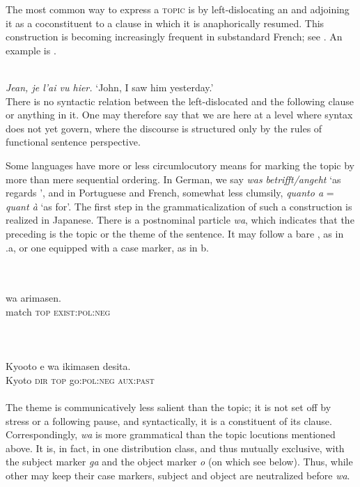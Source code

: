 The most common way to express a \textsc{topic} is by left-dislocating an \np and adjoining it as a coconstituent to a clause in which it is anaphorically resumed. This construction is becoming increasingly frequent in substandard French; see \citet{Ashby1981}. An example is .

\ea\label{ex:E92}
\langinfo{\LangFren}{}{}\\
 {\itshape Jean, je l'ai vu hier.}
\glt ‘John, I saw him yesterday.’\\
\z
\noindent There is no syntactic relation between the left-dislocated \np and the following clause or anything in it. One may therefore say that we are here at a level where syntax does not yet govern, where the discourse is structured only by the rules of functional sentence perspective.

Some languages have more or less circumlocutory means for marking the topic by more than mere sequential ordering. In German, we say \textit{was} \np \textit{betrifft/angeht} ‘as regards \np’, and in Portuguese and French, somewhat less clumsily, \textit{quanto a} = \textit{quant à} ‘as for’. The first step in the grammaticalization of such a construction is realized in Japanese. There is a postnominal particle \textit{wa}, which indicates that the preceding \np is the topic or the theme of the sentence. It may follow a bare \np, as in .a, or one equipped with a case marker, as in b.
 
\ea\label{ex:E93}
\langinfo{\LangJap}{}{} \\
 \ea {}\\
   {wa}  arimasen.\\
  {match}  {\textsc{top}}  \textsc{exist}:\textsc{pol}:\textsc{neg}\\
\\
\\
\ex {}\\
\gll  Kyooto  e  wa  ikimasen  desita.\\
  Kyoto   \textsc{dir}   \textsc{top}   go:\textsc{pol}:\textsc{neg}   \textsc{aux}:\textsc{past}\\
\\
\z
\z
\noindent The theme is communicatively less salient than the topic; it is not set off by stress or a following pause, and syntactically, it is a constituent of its clause. Correspondingly, \textit{wa} is more grammatical than the topic locutions mentioned above. It is, in fact, in one distribution class, and thus mutually exclusive, with the subject marker \textit{ga} and the object marker \textit{o} (on which see below). Thus, while other \nps may keep their case markers, subject and object are neutralized before \textit{wa}.

